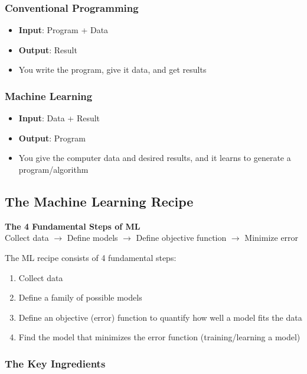 \documentclass[11pt,a4paper]{article}
\theoremstyle{definition}
\theoremstyle{plain}
\theoremstyle{remark}
\begin{document}
\subsubsection{Conventional Programming}
\begin{itemize}
    \item \textbf{Input}: Program + Data
    \item \textbf{Output}: Result
    \item You write the program, give it data, and get results
\end{itemize}

\subsubsection{Machine Learning}
\begin{itemize}
    \item \textbf{Input}: Data + Result
    \item \textbf{Output}: Program
    \item You give the computer data and desired results, and it learns to generate a program/algorithm
\end{itemize}

\subsection{The Machine Learning Recipe}

\begin{center}
\colorbox{blue!15}{\parbox{0.9\textwidth}{
\centering
\textbf{The 4 Fundamental Steps of ML}\\[0.2cm]
Collect data $\rightarrow$ Define models $\rightarrow$ Define objective function $\rightarrow$ Minimize error
}}
\end{center}

The ML recipe consists of 4 fundamental steps:
\begin{enumerate}
    \item Collect data
    \item Define a family of possible models
    \item Define an objective (error) function to quantify how well a model fits the data
    \item Find the model that minimizes the error function (training/learning a model)
\end{enumerate}

\subsubsection{The Key Ingredients}
\end{document}
